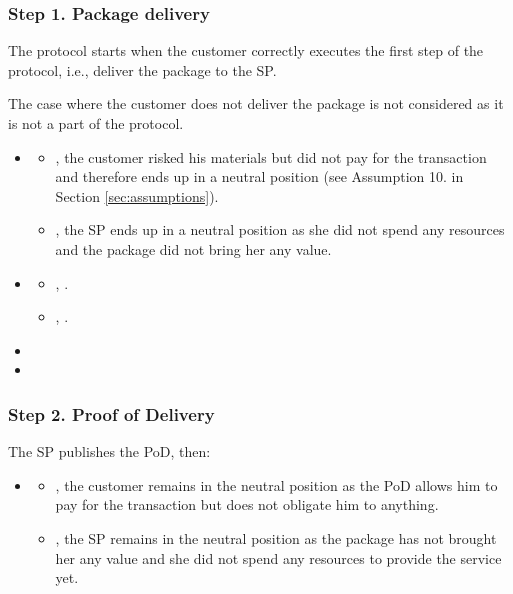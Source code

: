 \documentclass[pdftex,twocolumn,epjc3]{svjour3}
\begin{document}
{\subsubsection*{Step 1. \CustomerTurn{} Package delivery}\label{step-1-deliver-package}

The protocol starts when the customer correctly executes the first step of the protocol, i.e., deliver the package to the SP. 

The case where the customer does not deliver the package is not considered as it is not a part of the protocol.

\begin{itemize}
\item \AgreeablePath
  \begin{itemize}
    \item  {}, the customer risked his materials but did not pay for the transaction and therefore ends up in a neutral position (see Assumption 10. in Section \ref{sec:assumptions}).
    \item {}, the SP ends up in a neutral position as she did not spend any resources and the package did not bring her any value.
  \end{itemize}
\item \DisputePath
  \begin{itemize}
    \item {}, \CustomerLosesBeforePayment{}.
    \item {}, .
  \end{itemize}
\end{itemize}

\Fairness

\begin{itemize}
  \item {}
  \item {}
\end{itemize}

\subsubsection*{Step 2. \SPTurn{} Proof of Delivery}\label{step-2-proof-of-delivery}

The SP publishes the PoD, then:

\begin{itemize}
  \item \AgreeablePath
    \begin{itemize}
      \item {}, the customer remains in the neutral position as the PoD allows him to pay for the transaction but does not obligate him to anything.
      \item {}, the SP remains in the neutral position as the package has not brought her any value and she did not spend any resources to provide the service yet.
    \end{itemize}


\end{itemize}}
\end{document}
